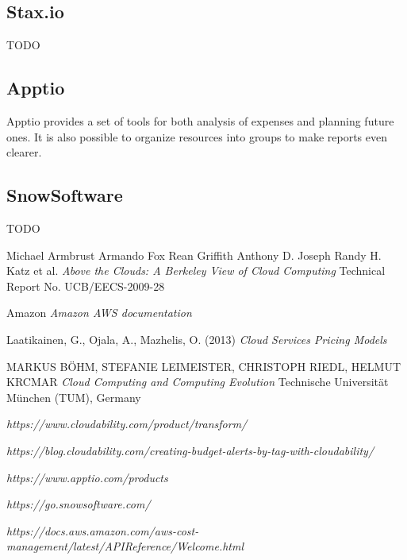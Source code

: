 \documentclass[licencjacka,en]{thesisclass}
\begin{document}
	\subsection{Stax.io}

	TODO

	\subsection{Apptio}

	Apptio provides a set of tools for both analysis of expenses and planning future ones. It
	is also possible to organize resources into groups to make reports even clearer.

	\subsection{SnowSoftware}

	TODO


    
\begin{thebibliography}{99}

    Michael Armbrust Armando Fox Rean Griffith Anthony D. Joseph Randy H. Katz et al.
    \textit{Above the Clouds: A Berkeley View of Cloud Computing} 
    Technical Report No. UCB/EECS-2009-28

    Amazon
    \textit{Amazon AWS documentation} 
        
    Laatikainen, G., Ojala, A., Mazhelis, O. (2013)
    \textit{Cloud Services Pricing Models}

    MARKUS BÖHM, STEFANIE LEIMEISTER, CHRISTOPH RIEDL, HELMUT KRCMAR
    \textit{Cloud Computing and Computing Evolution}
    Technische Universität München (TUM), Germany

    \textit{https://www.cloudability.com/product/transform/}

    \textit{https://blog.cloudability.com/creating-budget-alerts-by-tag-with-cloudability/}

    \textit{https://www.apptio.com/products}

    \textit{https://go.snowsoftware.com/}

    \textit{https://docs.aws.amazon.com/aws-cost-management/latest/APIReference/Welcome.html}

\end{thebibliography}
\end{document}
